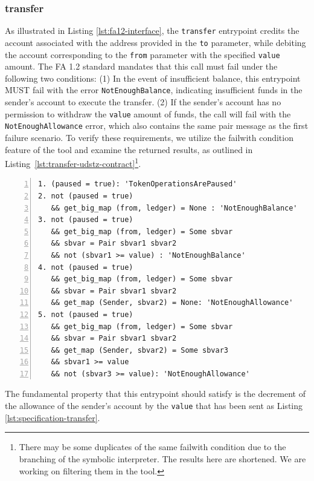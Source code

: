 \documentclass[a4paper,USenglish,cleveref, autoref,anonymous]{lipics-v2021}
\begin{document}
\subsubsection{transfer}
As illustrated in Listing \ref{lst:fa12-interface}, the
\lstinline/transfer/ entrypoint credits the account associated with
the address provided in the \lstinline/to/ parameter, while debiting
the account corresponding to the \lstinline/from/ parameter with the
specified \lstinline/value/ amount. The FA 1.2 standard mandates that
this call must fail under the following two conditions: (1) In the
event of insufficient balance, this entrypoint MUST fail with the
error \lstinline/NotEnoughBalance/, indicating insufficient funds in
the sender's account to execute the transfer. (2) If the sender's
account has no permission to withdraw the \lstinline/value/ amount of
funds, the call will fail with the \lstinline/NotEnoughAllowance/
error, which also contains the same pair message as the first failure
scenario. To verify these requirements, we utilize the failwith
condition feature of the tool and examine the returned results, as
outlined in Listing~\ref{lst:transfer-udstz-contract}\footnote{There may be some duplicates of the same failwith condition due to the branching of the symbolic interpreter. The results here are shortened. We are working on filtering them in the tool.}.
\begin{lstlisting}[float,captionpos=b,caption={Fail conditions for the \lstinline/transfer/ entrypoint},label={lst:transfer-udstz-contract},numbers=left]
1. (paused = true): 'TokenOperationsArePaused'
2. not (paused = true) 
   && get_big_map (from, ledger) = None : 'NotEnoughBalance'
3. not (paused = true) 
   && get_big_map (from, ledger) = Some sbvar 
   && sbvar = Pair sbvar1 sbvar2 
   && not (sbvar1 >= value) : 'NotEnoughBalance'
4. not (paused = true) 
   && get_big_map (from, ledger) = Some sbvar 
   && sbvar = Pair sbvar1 sbvar2 
   && get_map (Sender, sbvar2) = None: 'NotEnoughAllowance'
5. not (paused = true) 
   && get_big_map (from, ledger) = Some sbvar 
   && sbvar = Pair sbvar1 sbvar2 
   && get_map (Sender, sbvar2) = Some sbvar3 
   && sbvar1 >= value 
   && not (sbvar3 >= value): 'NotEnoughAllowance'
\end{lstlisting}
The fundamental property that this entrypoint should satisfy is the decrement of the allowance of the sender's account by the \lstinline/value/ that has been sent as Listing \ref{lst:specification-transfer}.
\end{document}

